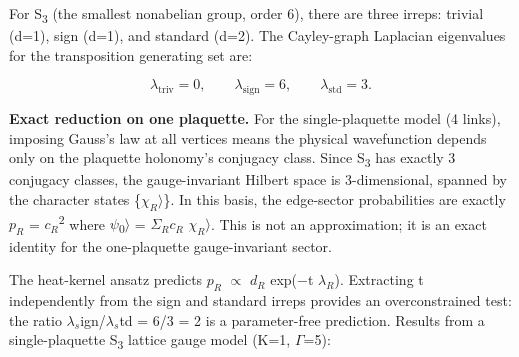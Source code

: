 \documentclass[11pt,a4paper]{article}
\theoremstyle{remark}
\begin{document}
For S\textsubscript{3} (the smallest nonabelian group, order 6), there are three irreps:
trivial (d=1), sign (d=1), and standard (d=2). The Cayley-graph Laplacian
eigenvalues for the transposition generating set are:

\[
\lambda_{\mathrm{triv}} = 0, \qquad \lambda_{\mathrm{sign}} = 6, \qquad
\lambda_{\mathrm{std}} = 3.
\]

\textbf{Exact reduction on one plaquette.} For the single-plaquette model (4 links),
imposing Gauss's law at all vertices means the physical wavefunction depends
only on the plaquette holonomy's conjugacy class. Since S\textsubscript{3} has exactly 3
conjugacy classes, the gauge-invariant Hilbert space is 3-dimensional, spanned
by the character states \{\textbar{}\(\ensuremath{\chi}_R\)\ensuremath{\rangle}\}. In this basis, the edge-sector
probabilities are exactly \(p_R\) = \textbar{}\(c_R\)\textbar\textsuperscript{2} where \textbar \ensuremath{\psi}\textsubscript{0}\ensuremath{\rangle} = \(\ensuremath{\Sigma}_R c_R\)
\textbar{}\(\ensuremath{\chi}_R\)\ensuremath{\rangle}. This is not an approximation; it is an exact identity for the
one-plaquette gauge-invariant sector.

The heat-kernel ansatz predicts \(p_R\) \ensuremath{\propto} \(d_R\) exp(\ensuremath{-}t \(\ensuremath{\lambda}_R\)). Extracting
t independently from the sign and standard irreps provides an overconstrained
test: the ratio \(\ensuremath{\lambda}_s\)ign/\(\ensuremath{\lambda}_s\)td = 6/3 = 2 is a
parameter-free prediction. Results from a single-plaquette S\textsubscript{3} lattice gauge
model (K=1, \ensuremath{\Gamma}=5):
\end{document}
